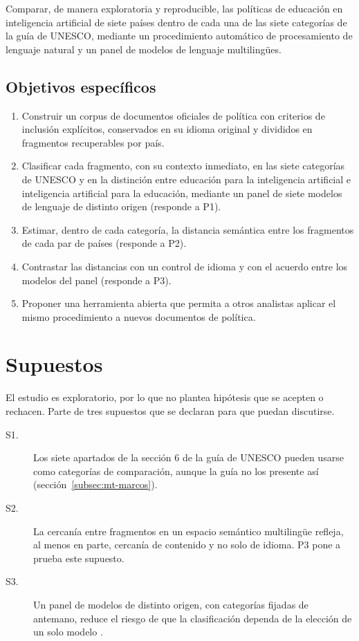 Comparar, de manera exploratoria y reproducible, las políticas de educación en inteligencia
artificial de siete países dentro de cada una de las siete categorías de la guía de UNESCO,
mediante un procedimiento automático de procesamiento de lenguaje natural y un panel de
modelos de lenguaje multilingües.

\subsection{Objetivos específicos}

\begin{enumerate}
  \item[\textbf{OE1.}] Construir un corpus de documentos oficiales de política con criterios
  de inclusión explícitos, conservados en su idioma original y divididos en fragmentos
  recuperables por país.
  \item[\textbf{OE2.}] Clasificar cada fragmento, con su contexto inmediato, en las siete
  categorías de UNESCO y en la distinción entre educación para la inteligencia artificial e
  inteligencia artificial para la educación, mediante un panel de siete modelos de lenguaje
  de distinto origen (responde a P1).
  \item[\textbf{OE3.}] Estimar, dentro de cada categoría, la distancia semántica entre los
  fragmentos de cada par de países (responde a P2).
  \item[\textbf{OE4.}] Contrastar las distancias con un control de idioma y con el acuerdo
  entre los modelos del panel (responde a P3).
  \item[\textbf{OE5.}] Proponer una herramienta abierta que permita a otros analistas aplicar
  el mismo procedimiento a nuevos documentos de política.
\end{enumerate}

\section{Supuestos}
\label{sec:supuestos}

El estudio es exploratorio, por lo que no plantea hipótesis que se acepten o rechacen. Parte
de tres supuestos que se declaran para que puedan discutirse.

\begin{description}
  \item[S1.] Los siete apartados de la sección 6 de la guía de UNESCO pueden usarse como
  categorías de comparación, aunque la guía no los presente así
  (sección~\ref{subsec:mt-marcos}).
  \item[S2.] La cercanía entre fragmentos en un espacio semántico multilingüe refleja, al
  menos en parte, cercanía de contenido y no solo de idioma. P3 pone a prueba este supuesto.
  \item[S3.] Un panel de modelos de distinto origen, con categorías fijadas de antemano,
  reduce el riesgo de que la clasificación dependa de la elección de un solo modelo
  \citep{baumann2025llmhacking}.
\end{description}


